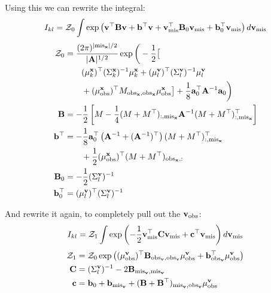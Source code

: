 \documentclass[letterpaper]{article}
\newcommand{\tp}{\top}
\newcommand{\vx}{{\bf x}}
\newcommand{\vv}{{\bf v}}
\newcommand{\va}{{\bf a}}
\newcommand{\vA}{{\bf A}}
\newcommand{\vb}{{\bf b}}
\newcommand{\vB}{{\bf B}}
\newcommand{\vc}{{\bf c}}
\newcommand{\vC}{{\bf C}}
\newcommand{\mis}{\text{mis}}
\newcommand{\obs}{\text{obs}}
\newcommand{\misx}{{\text{mis}_\vx}}
\newcommand{\obsx}{{\text{obs}_\vx}}
\newcommand{\misv}{{\text{mis}_\vv}}
\newcommand{\obsv}{{\text{obs}_\vv}}
\begin{document}
Using this we can rewrite the integral:
\begin{equation*}
\begin{aligned}
I_{kl} = \mathcal{Z}_0 \int \exp \left(\vv^\tp \vB \vv + \vb^\tp \vv + \vv_\mis^\tp \vB_0 \vv_\mis + \vb_0^\tp \vv_\mis \right) d\vv_\mis
\end{aligned}
\end{equation*}
\begin{equation*}
\begin{aligned}
\mathcal{Z}_0 &= \frac{(2\pi)^{|\misx|/2}}{|\vA|^{1/2}}\exp\bigg(-\frac{1}{2}\big[ \\
&\hspace{2em} (\mu_k^\vx)^\tp (\Sigma_k^\vx)^{-1} \mu_k^\vx
+ (\mu_l^\vv)^\tp (\Sigma_l^\vv)^{-1}\mu_l^\vv \\
&\hspace{2em}+ (\mu^\vx_\obs)^\tp M_{\obsx,\obsx}\mu^\vx_\obs \big]
+ \frac{1}{8}\va_0^\tp \vA^{-1} \va_0 \bigg) \\
\vB &= -\frac{1}{2} \left[M - \frac{1}{4}(M + M^\tp)_{:,\misx} \vA^{-1} (M + M^\tp)_{:,\misx}^\tp \right] \\
\vb^\tp &= -\frac{1}{8}\va_0^\tp \left(\vA^{-1} + (\vA^{-1})^\tp\right) (M + M^\tp)_{:,\misx}^\tp \\
&\hspace{2em}+ \frac{1}{2} (\mu^\vx_\obs)^\tp (M + M^\tp)_{\obsx,:} \\
\vB_0 &= -\frac{1}{2} (\Sigma_l^\vv)^{-1} \\
\vb_0^\tp &= (\mu_l^\vv)^\tp (\Sigma_l^\vv)^{-1}
\end{aligned}
\end{equation*}

And rewrite it again, to completely pull out the $\vv_\obs$:
\begin{equation*}
\begin{aligned}
I_{kl} = \mathcal{Z}_1 \int \exp \left(-\frac{1}{2}\vv_\mis^\tp \vC \vv_\mis + \vc^\tp
\vv_\mis \right) d\vv_\mis
\end{aligned}
\end{equation*}
\begin{equation*}
\begin{aligned}
  \mathcal{Z}_1 &= \mathcal{Z}_0 \exp\left((\mu_\obs^\vv)^\tp\vB_{\obsv,\obsv}\mu_\obs^\vv
  + \vb_\obsv^\tp \mu_\obs^\vv \right) \\
\vC &= (\Sigma_l^\vv)^{-1} -2 \vB_{\misv,\misv} \\
\vc &= \vb_0 + \vb_\misv + (\vB + \vB^\tp)_{\misv,\obsv}\mu_\obs^\vv
\end{aligned}
\end{equation*}
\end{document}
